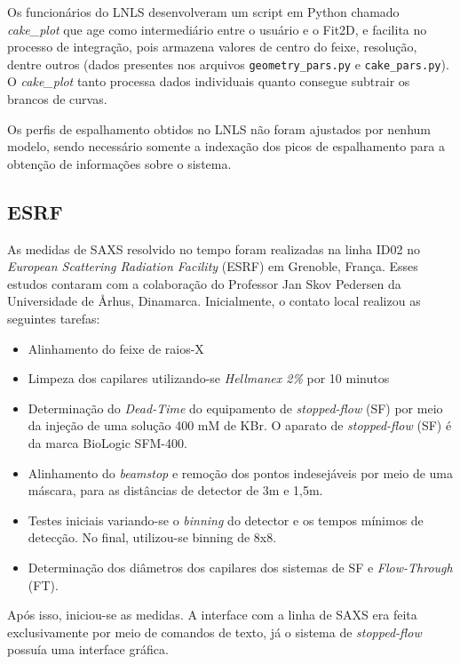 			Os funcionários do LNLS desenvolveram um script em Python chamado \emph{cake\_plot} que age como intermediário entre o usuário e o Fit2D, e facilita no processo de integração, pois armazena valores de centro do feixe, resolução, dentre outros (dados presentes nos arquivos \texttt{geometry\_pars.py} e \texttt{cake\_pars.py}). O \emph{cake\_plot} tanto processa dados individuais quanto consegue subtrair os brancos de curvas.
			
			Os perfis de espalhamento obtidos no LNLS não foram ajustados por nenhum modelo, sendo necessário somente a indexação dos picos de espalhamento para a obtenção de informações sobre o sistema.		
			
			\subsection{ESRF}  
			As medidas de SAXS resolvido no tempo foram realizadas na linha ID02 no \emph{European Scattering Radiation Facility} (ESRF) em Grenoble, França. Esses estudos contaram com a colaboração do Professor Jan Skov Pedersen da Universidade de \AA rhus, Dinamarca. Inicialmente, o contato local realizou as seguintes tarefas:
			
			\begin{itemize}[noitemsep]
				\item Alinhamento do feixe de raios-X
				\item Limpeza dos capilares utilizando-se \emph{Hellmanex 2\%} por 10 minutos
				\item Determinação do \emph{Dead-Time} do equipamento de \emph{stopped-flow} (SF) por meio da injeção de uma solução 400 mM de KBr. O aparato de \emph{stopped-flow} (SF) é da marca BioLogic SFM-400.
				\item Alinhamento do \emph{beamstop} e remoção dos pontos indesejáveis por meio de uma máscara, para as distâncias de detector de 3m e 1,5m.
				\item Testes iniciais variando-se o \emph{binning} do detector e os tempos mínimos de detecção. No final, utilizou-se binning de 8x8.
				\item Determinação dos diâmetros dos capilares dos sistemas de SF e \emph{Flow-Through} (FT).
			\end{itemize}
			
			Após isso, iniciou-se as medidas. A interface com a linha de SAXS era feita exclusivamente por meio de comandos de texto, já o sistema de \emph{stopped-flow} possuía uma interface gráfica.
			
